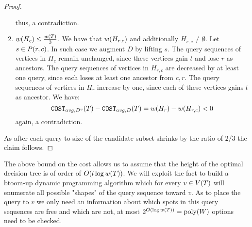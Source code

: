 \begin{theorem}
\begin{proof}
\begin{enumerate}
$$$$
thus, a contradiction.
\item $w\mathopen{}\left( H_c \right)\leq \frac{w\mathopen{}\left( T \right)}{3}$. We have that $w\mathopen{}\left( H_{r, c} \right)$ and additionally $H_{r, c}\neq\emptyset$. Let $s\in P\mathopen{}\left( r, c \right)$. In such case we augment $D$ by lifting $s$. The query sequences of vertices in
$H_{c}$ remain  unchanged, since these vertices gain $t$ and lose $r$ as ancestors. The query sequences of vertices in $H_{r,c}$ are
decreased by at least one query, since each loses at least one ancestor from ${c, r}$. The query sequences of
vertices in $H_r$ increase by one, since each of these vertices gains $t$ as ancestor. We have:
$$
\texttt{COST}_{avg, D^v}\mathopen{}\left( T \right)-\texttt{COST}_{avg, D}\mathopen{}\left( T \right)=w\mathopen{}\left( H_r \right)-w\mathopen{}\left( H_{r,c} \right)< 0
$$
again, a contradiction.
        \end{enumerate}
As after each query to size of the candidate subset shrinks by the ratio of $2/3$ the claim follows.
    \end{proof}
\end{theorem}
The above bound on the cost allows us to assume that the height of the optimal decision tree is of order of $O\mathopen{}\left( l\log w\mathopen{}\left( T \right) \right)$. We will exploit the fact to build a btoom-up dynamic programming algorithm which for every $v\in V\mathopen{}\left( T \right)$ will enumerate all possible "shapes" of the query sequence toward $v$. As to place the query to $v$ we only need an information about which spots in this query sequences are free and which are not, at most $2^{O\mathopen{}\left( \log w\mathopen{}\left( T \right) \right)}=\text{poly}\mathopen{}\left( W \right)$ options need to be checked. 
